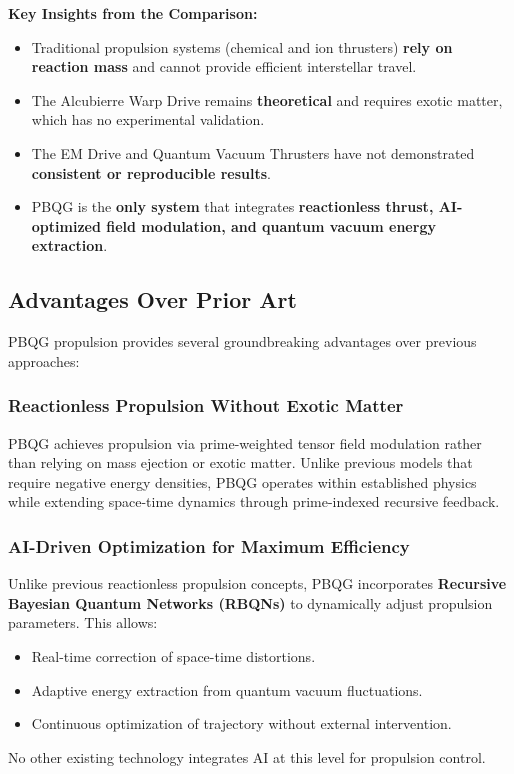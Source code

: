 \documentclass{article}
\theoremstyle{plain}
\begin{document}
\textbf{Key Insights from the Comparison:}
\begin{itemize}
    \item Traditional propulsion systems (chemical and ion thrusters) \textbf{rely on reaction mass} and cannot provide efficient interstellar travel.
    \item The Alcubierre Warp Drive remains \textbf{theoretical} and requires exotic matter, which has no experimental validation.
    \item The EM Drive and Quantum Vacuum Thrusters have not demonstrated \textbf{consistent or reproducible results}.
    \item PBQG is the \textbf{only system} that integrates \textbf{reactionless thrust, AI-optimized field modulation, and quantum vacuum energy extraction}.
\end{itemize}

\subsection{Advantages Over Prior Art}
\label{subsec:advantages}

PBQG propulsion provides several groundbreaking advantages over previous approaches:

\subsubsection{Reactionless Propulsion Without Exotic Matter}
PBQG achieves propulsion via prime-weighted tensor field modulation rather than relying on mass ejection or exotic matter. Unlike previous models that require negative energy densities, PBQG operates within established physics while extending space-time dynamics through prime-indexed recursive feedback.

\subsubsection{AI-Driven Optimization for Maximum Efficiency}
Unlike previous reactionless propulsion concepts, PBQG incorporates \textbf{Recursive Bayesian Quantum Networks (RBQNs)} to dynamically adjust propulsion parameters. This allows:
\begin{itemize}
    \item Real-time correction of space-time distortions.
    \item Adaptive energy extraction from quantum vacuum fluctuations.
    \item Continuous optimization of trajectory without external intervention.
\end{itemize}
No other existing technology integrates AI at this level for propulsion control.
\end{document}

